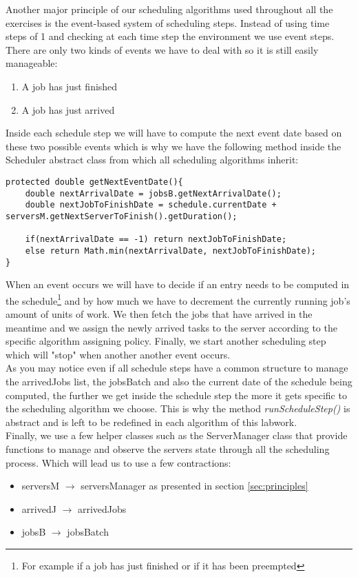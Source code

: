 \documentclass[./report.tex]{subfiles}
\begin{document}
Another major principle of our scheduling algorithms used throughout all the exercises is the event-based system of scheduling steps. Instead of using time steps of 1 and checking at each time step the environment we use event steps. There are only two kinds of events we have to deal with so it is still easily manageable:
\begin{enumerate}
	\item A job has just finished
	\item A job has just arrived\\
\end{enumerate}

\newpage
Inside each schedule step we will have to compute the next event date based on these two possible events which is why we have the following method inside the Scheduler abstract class from which all scheduling algorithms inherit:
\begin{lstlisting}[style=Java, caption={Method used to compute the next event fate}]
protected double getNextEventDate(){
	double nextArrivalDate = jobsB.getNextArrivalDate();
	double nextJobToFinishDate = schedule.currentDate + serversM.getNextServerToFinish().getDuration();
	
	if(nextArrivalDate == -1) return nextJobToFinishDate;
	else return Math.min(nextArrivalDate, nextJobToFinishDate);
}
\end{lstlisting}

When an event occurs we will have to decide if an entry needs to be computed in the schedule\footnote{For example if a job has just finished or if it has been preempted} and by how much we have to decrement the currently running job's amount of units of work. We then fetch the jobs that have arrived in the meantime and we assign the newly arrived tasks to the server according to the specific algorithm assigning policy. Finally, we start another scheduling step which will "stop" when another another event occurs.\\

As you may notice even if all schedule steps have a common structure to manage the arrivedJobs list, the jobsBatch and also the current date of the schedule being computed, the further we get inside the schedule step the more it gets specific to the scheduling algorithm we choose. This is why the method \textit{runScheduleStep()} is abstract and is left to be redefined in each algorithm of this labwork.\\

Finally, we use a few helper classes such as the ServerManager class that provide functions to manage and observe the servers state through all the scheduling process. Which will lead us to use a few contractions:
\begin{itemize}
	\item serversM $\rightarrow$ serversManager as presented in section \ref{sec:principles}
	\item arrivedJ $\rightarrow$ arrivedJobs
	\item jobsB $\rightarrow$ jobsBatch\\
\end{itemize}
\end{document}
